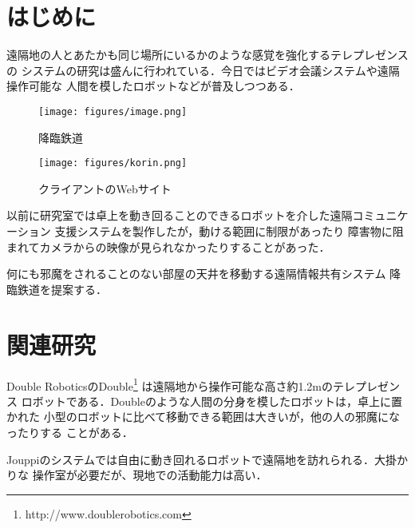 \documentclass[submit,techreq]{ipsj}
\begin{document}
\section{はじめに}

遠隔地の人とあたかも同じ場所にいるかのような感覚を強化するテレプレゼンスの
システムの研究は盛んに行われている．今日ではビデオ会議システムや遠隔操作可能な
人間を模したロボットなどが普及しつつある．


\begin{figure}[H]
\begin{center}
\texttt{[image: figures/image.png]}
\end{center}
\caption{降臨鉄道}
\label{screenshot2}
\end{figure}

\begin{figure}[H]
\begin{center}
\texttt{[image: figures/korin.png]}
\end{center}
\caption{クライアントのWebサイト}
\label{screenshot3}
\end{figure}

以前に研究室では卓上を動き回ることのできるロボットを介した遠隔コミュニケーション
支援システムを製作した\cite{Hirota:Korin}が，動ける範囲に制限があったり
障害物に阻まれてカメラからの映像が見られなかったりすることがあった．

何にも邪魔をされることのない部屋の天井を移動する遠隔情報共有システム
降臨鉄道を提案する．

\section{関連研究}

Double RoboticsのDouble\footnote{
  \textsf{http://www.doublerobotics.com}
}
は遠隔地から操作可能な高さ約1.2mのテレプレゼンス
ロボットである．Doubleのような人間の分身を模したロボットは，卓上に置かれた
小型のロボットに比べて移動できる範囲は大きいが，他の人の邪魔になったりする
ことがある．

Jouppiのシステム\cite{Jouppi:2002:FST:587078.587128}では自由に動き回れるロボットで遠隔地を訪れられる．大掛かりな
操作室が必要だが、現地での活動能力は高い．
\end{document}
